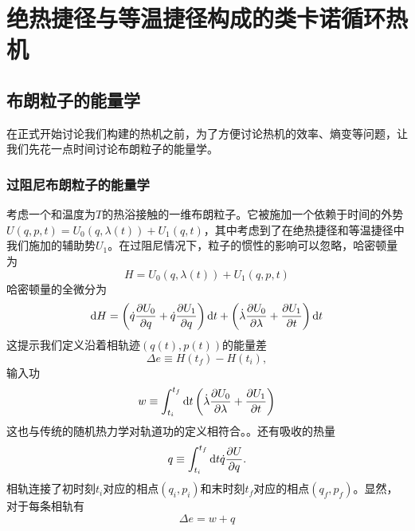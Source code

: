 \chapter{绝热捷径与等温捷径构成的类卡诺循环热机}
\label{c3}
\section{布朗粒子的能量学}
\qquad 在正式开始讨论我们构建的热机之前，为了方便讨论热机的效率、熵变等问题，让我们先花一点时间讨论布朗粒子的能量学。
\subsection{过阻尼布朗粒子的能量学}

考虑一个和温度为$T$的热浴接触的一维布朗粒子。它被施加一个依赖于时间的外势$U(q,p,t) = U_0 (q,\lambda(t)) + U_1 (q,t)$，其中考虑到了在绝热捷径和等温捷径中我们施加的辅助势$U_1$。在过阻尼情况下，粒子的惯性的影响可以忽略，哈密顿量为
\begin{equation}
    H=U_0 (q,\lambda(t)) + U_1 (q,p,t)
    \label{eq31.1}
\end{equation}
哈密顿量的全微分为
\begin{equation}
    \mathrm{d} H=\left(\dot{q} \frac{\partial U_0}{\partial q} + \dot{q} \frac{\partial U_1}{\partial q}  \right) \mathrm{d} t+\left(\dot{\lambda} \frac{\partial U_0}{\partial \lambda} + \frac{\partial U_1}{\partial t} \right) \mathrm{d} t
    \label{eq31.2}
\end{equation}
这提示我们定义沿着相轨迹$(q(t), p(t))$的能量差\cite{Tu2013}
\begin{equation}
     \Delta e \equiv H\left(t_{f}\right)-H\left(t_{i}\right),
     \label{eq31.3}
\end{equation}
输入功
\begin{equation}
    w \equiv \int_{t_{i}}^{t_{f}} \mathrm{d} t \left( \dot{\lambda} \frac{\partial U_0}{\partial \lambda} + \frac{\partial U_1}{\partial t} \right)
    \label{eq31.4}
\end{equation}
这也与传统的随机热力学对轨道功的定义相符合。\cite{Sekimoto2010,Jarzynski1997,Sekimoto_1997}。还有吸收的热量
\begin{equation}
    q \equiv \int_{t_{i}}^{t_{f}} \mathrm{d} t \dot{q} \frac{\partial U}{\partial q} .
    \label{eq31.5}
\end{equation}
相轨连接了初时刻$t_i$对应的相点$(q_i , p_i )$和末时刻$t_f$对应的相点$(q_f , p_f )$。显然，对于每条相轨有
\begin{equation}
    \Delta e = w + q
    \label{eq31.6}
\end{equation}

